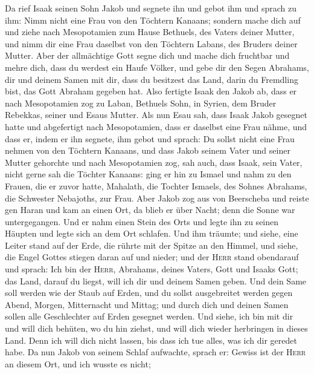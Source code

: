  Da rief Isaak seinen Sohn Jakob und segnete ihn und gebot
ihm und sprach zu ihm: Nimm nicht eine Frau von den Töchtern Kanaans;
 sondern mache dich auf und ziehe nach Mesopotamien zum
Hause Bethuels, des Vaters deiner Mutter, und nimm dir eine Frau
daselbst von den Töchtern Labans, des Bruders deiner Mutter.
 Aber der allmächtige Gott segne dich und mache dich
fruchtbar und mehre dich, dass du werdest ein Haufe Völker,
 und gebe dir den Segen Abrahams, dir und deinem Samen mit
dir, dass du besitzest das Land, darin du Fremdling bist, das Gott
Abraham gegeben hat.  Also fertigte Isaak den Jakob ab,
dass er nach Mesopotamien zog zu Laban, Bethuels Sohn, in Syrien, dem
Bruder Rebekkas, seiner und Esaus Mutter.  Als nun Esau
sah, dass Isaak Jakob gesegnet hatte und abgefertigt nach Mesopotamien,
dass er daselbst eine Frau nähme, und dass er, indem er ihn segnete, ihm
gebot und sprach: Du sollst nicht eine Frau nehmen von den Töchtern
Kanaans,  und dass Jakob seinem Vater und seiner Mutter
gehorchte und nach Mesopotamien zog,  sah auch, dass
Isaak, sein Vater, nicht gerne sah die Töchter Kanaans: 
ging er hin zu Ismael und nahm zu den Frauen, die er zuvor hatte,
Mahalath, die Tochter Ismaels, des Sohnes Abrahams, die Schwester
Nebajoths, zur Frau.  Aber Jakob zog aus von Beerscheba
und reiste gen Haran  und kam an einen Ort, da blieb er
über Nacht; denn die Sonne war untergegangen. Und er nahm einen Stein
des Orts und legte ihn zu seinen Häupten und legte sich an dem Ort
schlafen.  Und ihm träumte; und siehe, eine Leiter stand
auf der Erde, die rührte mit der Spitze an den Himmel, und siehe, die
Engel Gottes stiegen daran auf und nieder;  und der
\textsc{Herr} stand obendarauf und sprach: Ich bin der \textsc{Herr},
Abrahams, deines Vaters, Gott und Isaaks Gott; das Land, darauf du
liegst, will ich dir und deinem Samen geben.  Und dein
Same soll werden wie der Staub auf Erden, und du sollst ausgebreitet
werden gegen Abend, Morgen, Mitternacht und Mittag; und durch dich und
deinen Samen sollen alle Geschlechter auf Erden gesegnet werden.
 Und siehe, ich bin mit dir und will dich behüten, wo du
hin ziehst, und will dich wieder herbringen in dieses Land. Denn ich
will dich nicht lassen, bis dass ich tue alles, was ich dir geredet
habe.  Da nun Jakob von seinem Schlaf aufwachte, sprach
er: Gewiss ist der \textsc{Herr} an diesem Ort, und ich wusste es nicht;
